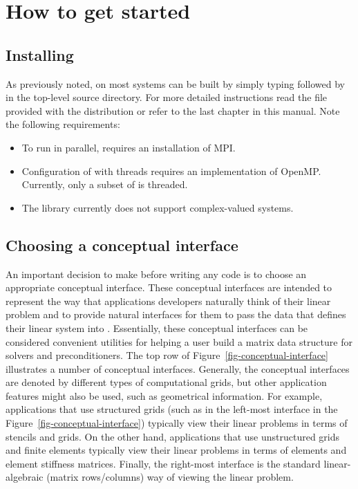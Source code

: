 \section{How to get started}



\subsection{Installing \hypre{}}

As previously noted, on most systems \hypre{} can be built by simply typing
 followed by  in the top-level source directory. For
more detailed instructions read the  file provided with the
\hypre{} distribution or refer to the last chapter in this manual. Note the
following requirements:


\begin{itemize}

\item To run in parallel, \hypre{} requires an installation of MPI.

\item Configuration of \hypre{} with threads requires an implementation
of OpenMP.  Currently, only a subset of \hypre{} is threaded.

\item The \hypre{} library currently does not support complex-valued systems.

\end{itemize}

\subsection{Choosing a conceptual interface}

An important decision to make before writing any code is to choose an
appropriate conceptual interface.  These conceptual interfaces are
intended to represent the way that applications developers naturally
think of their linear problem and to provide natural interfaces for them
to pass the data that defines their linear system into \hypre{}.
Essentially, these conceptual interfaces can be considered convenient
utilities for helping a user build a matrix data structure for
\hypre{} solvers and preconditioners.  The top row of
Figure~\ref{fig-conceptual-interface} illustrates a number of
conceptual interfaces.  Generally, the conceptual interfaces are
denoted by different types of computational grids, but other
application features might also be used, such as geometrical
information.  For example, applications that use structured grids
(such as in the left-most interface in the
Figure~\ref{fig-conceptual-interface}) typically view their linear
problems in terms of stencils and grids.  On the other hand,
applications that use unstructured grids and finite elements typically
view their linear problems in terms of elements and element stiffness
matrices. Finally, the right-most interface is the standard
linear-algebraic (matrix rows/columns) way of viewing the linear
problem.

